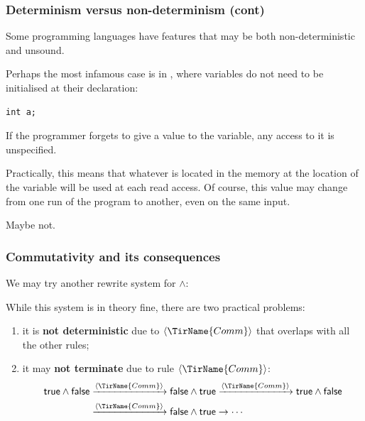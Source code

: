 %
\begin{frame}[containsverbatim]
\frametitle{Determinism versus non-determinism (cont)}

\noindent Some programming languages have features that may be both
non-deterministic and unsound.

\bigskip

Perhaps the most infamous case is in \C, where variables do not need
to be initialised at their declaration: {\small
\begin{verbatim}
int a;
\end{verbatim}
}
If the programmer forgets to give a value to the variable, any access
to it is unspecified.

\bigskip

Practically, this means that whatever is located in the memory at the
location of the variable will be used at each read access. Of course,
this value may change from one run of the program to another, even
on the same input.

\bigskip

Maybe not.

\end{frame}

%
\begin{frame}
\frametitle{Commutativity and its consequences}

We may try another rewrite system for \(\wedge\):
While this system is in theory fine, there are two practical problems:
\begin{enumerate}

  \item it is \textbf{not deterministic} due to
    \(\rname{\TirName{Comm}}\) that overlaps with all the other rules;

  \item it may \textbf{not terminate} due to rule
    \(\rname{\TirName{Comm}}\):
\begin{align*}
\true \wedge \false &\xrightarrow{\rname{\TirName{Comm}}} \false \wedge
\true \xrightarrow{\rname{\TirName{Comm}}} \true \wedge \false\\
&\xrightarrow{\rname{\TirName{Comm}}} \false \wedge \true \rightarrow
\cdots
\end{align*}

\end{enumerate}

\end{frame}

